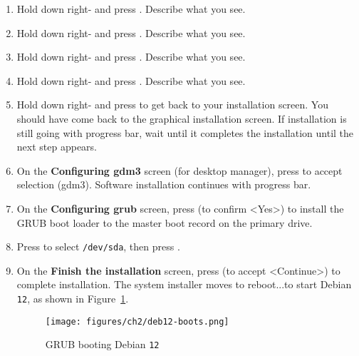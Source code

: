 \begin{enumerate}
\vspace{0.250in}

\item Hold down right-{} and press {}. Describe what you see. 

\vspace{0.25in}

\item Hold down right-{} and press {}. Describe what you see.

\vspace{0.250in}

\item Hold down right-{} and press {}. Describe what you see.

\vspace{0.250in}

\item {\label{end:l2.5}} Hold down right-{} and press {}. Describe what you see.

\vspace{0.250in}

\item Hold down right-{} and press {} to get back to your installation screen. You should have come back to the graphical installation screen. If installation is still going with progress bar, wait until it completes the installation until the next step appears.     

\item On the {\bf{Configuring gdm3}} screen (for desktop manager), press {} to accept selection (gdm3). Software installation continues with progress bar. 

\item On the {\bf{Configuring grub}} screen, press {} (to confirm <Yes>) to install the GRUB boot loader to the master boot record on the primary drive. 

\item Press {\keys{$\downarrow$}} to select {\tt{/dev/sda}}, then press {}.  

\item On the {\bf{Finish the installation}} screen, press {} (to accept <Continue>) to complete installation. The system installer moves to reboot...to start Debian {\tt{12}}, as shown in Figure~\ref{fig:deb12-boots}. 

\begin{figure}[hbt!]\centering
   \texttt{[image: figures/ch2/deb12-boots.png]}
   \caption{GRUB booting Debian {\tt{12}}} \label{fig:deb12-boots} %
\end{figure}

\end{enumerate} 

